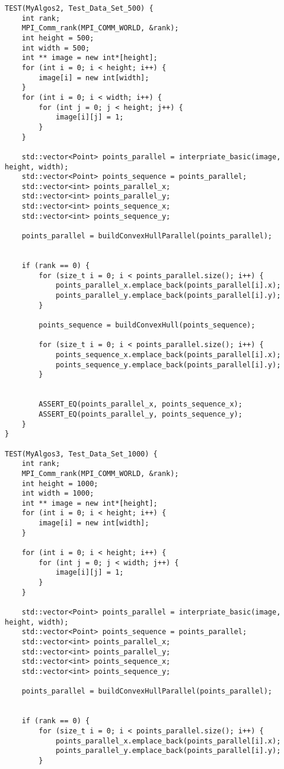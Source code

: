 \documentclass{report}
\begin{document}
\begin{lstlisting}
TEST(MyAlgos2, Test_Data_Set_500) {
    int rank;
    MPI_Comm_rank(MPI_COMM_WORLD, &rank);
    int height = 500;
    int width = 500;
    int ** image = new int*[height];
    for (int i = 0; i < height; i++) {
        image[i] = new int[width];
    }
    for (int i = 0; i < width; i++) {
        for (int j = 0; j < height; j++) {
            image[i][j] = 1;
        }
    }

    std::vector<Point> points_parallel = interpriate_basic(image, height, width);
    std::vector<Point> points_sequence = points_parallel;
    std::vector<int> points_parallel_x;
    std::vector<int> points_parallel_y;
    std::vector<int> points_sequence_x;
    std::vector<int> points_sequence_y;

    points_parallel = buildConvexHullParallel(points_parallel);


    if (rank == 0) {
        for (size_t i = 0; i < points_parallel.size(); i++) {
            points_parallel_x.emplace_back(points_parallel[i].x);
            points_parallel_y.emplace_back(points_parallel[i].y);
        }

        points_sequence = buildConvexHull(points_sequence);

        for (size_t i = 0; i < points_parallel.size(); i++) {
            points_sequence_x.emplace_back(points_parallel[i].x);
            points_sequence_y.emplace_back(points_parallel[i].y);
        }


        ASSERT_EQ(points_parallel_x, points_sequence_x);
        ASSERT_EQ(points_parallel_y, points_sequence_y);
    }
}

TEST(MyAlgos3, Test_Data_Set_1000) {
    int rank;
    MPI_Comm_rank(MPI_COMM_WORLD, &rank);
    int height = 1000;
    int width = 1000;
    int ** image = new int*[height];
    for (int i = 0; i < height; i++) {
        image[i] = new int[width];
    }

    for (int i = 0; i < height; i++) {
        for (int j = 0; j < width; j++) {
            image[i][j] = 1;
        }
    }

    std::vector<Point> points_parallel = interpriate_basic(image, height, width);
    std::vector<Point> points_sequence = points_parallel;
    std::vector<int> points_parallel_x;
    std::vector<int> points_parallel_y;
    std::vector<int> points_sequence_x;
    std::vector<int> points_sequence_y;

    points_parallel = buildConvexHullParallel(points_parallel);


    if (rank == 0) {
        for (size_t i = 0; i < points_parallel.size(); i++) {
            points_parallel_x.emplace_back(points_parallel[i].x);
            points_parallel_y.emplace_back(points_parallel[i].y);
        }


\end{lstlisting}
\end{document}
